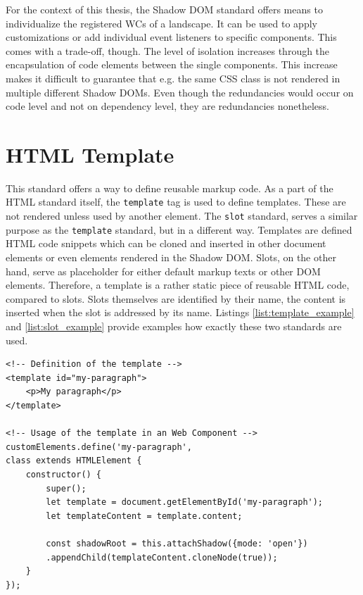 For the context of this thesis, the Shadow DOM standard offers means to individualize the registered WCs of a landscape. It can be used to apply customizations or add individual event listeners to specific components. This comes with a trade-off, though. The level of isolation increases through the encapsulation of code elements between the single components. This increase makes it difficult to guarantee that e.g. the same CSS class is not rendered in multiple different Shadow DOMs. Even though the redundancies would occur on code level and not on dependency level, they are redundancies nonetheless.

\section{HTML Template}

This standard offers a way to define reusable markup code. As a part of the HTML standard itself, the \texttt{template} tag is used to define templates. These are not rendered unless used by another element. The \texttt{slot} standard, serves a similar purpose as the \texttt{template} standard, but in a different way. Templates are defined HTML code snippets which can be cloned and inserted in other document elements or even elements rendered in the Shadow DOM.
Slots, on the other hand, serve as placeholder for either default markup texts or other DOM elements. Therefore, a template is a rather static piece of reusable HTML code, compared to slots.
Slots themselves are identified by their name, the content is inserted when the slot is addressed by its name.
Listings \ref{list:template_example} and \ref{list:slot_example} provide examples how exactly these two standards are used. \cite{wc_html_template_slots}

\begin{lstlisting}[language=HTML5,caption=Definition and usage of the \texttt{template} standard \cite{wc_html_template_slots}, label=list:template_example,  xleftmargin=.0\textwidth, xrightmargin=.0\textwidth]
<!-- Definition of the template -->
<template id="my-paragraph">
	<p>My paragraph</p>
</template>

<!-- Usage of the template in an Web Component -->
customElements.define('my-paragraph',
class extends HTMLElement {
	constructor() {
		super();
		let template = document.getElementById('my-paragraph');
		let templateContent = template.content;
		
		const shadowRoot = this.attachShadow({mode: 'open'})
		.appendChild(templateContent.cloneNode(true));
	}
});
\end{lstlisting}

